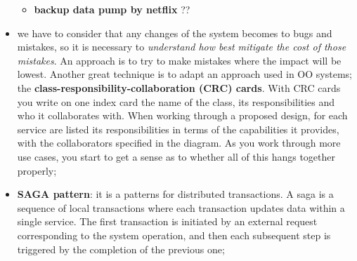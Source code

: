\documentclass[oneside]{article}
\begin{document}
\begin{itemize}
\begin{itemize}
            \item \textbf{backup data pump by netflix} ??
            \newline
            \newline
            \newline
        \end{itemize}
        
    \item we have to consider that any changes of the system becomes to bugs and mistakes, so it is necessary to \textit{understand how best mitigate the cost of those mistakes}. An approach is to try to make mistakes where the impact will be lowest. Another great technique is to adapt an approach used in OO systems; the \textbf{class-responsibility-collaboration (CRC) cards}. With CRC cards you write on one index card the name of the class, its responsibilities and who it collaborates with. When working through a proposed design, for each service are listed its responsibilities in terms of the capabilities it provides, with the collaborators specified in the diagram. As you work through more use cases, you start to get a sense as to whether all of this hangs together properly;
        
    \item \textbf{SAGA pattern}: it is a patterns for distributed transactions. A saga is a sequence of local transactions where each transaction updates data within a single service. The first transaction is initiated by an external request corresponding to the system operation, and then each subsequent step is triggered by the completion of the previous one;
\end{itemize}




\newpage
\end{document}
